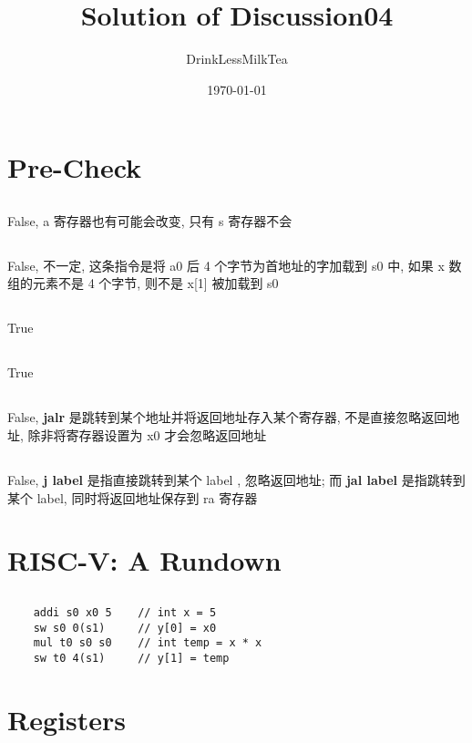 \documentclass[UTF8,10pt,a4paper]{ctexart}
\title{Solution of Discussion04}
\author{DrinkLessMilkTea}
\date{\today}
\begin{document}
\maketitle
\section{Pre-Check}
\subsection{}
False, a 寄存器也有可能会改变, 只有 s 寄存器不会
\subsection{}
False, 不一定, 这条指令是将 a0 后 4 个字节为首地址的字加载到 s0 中, 如果 x 数组的元素不是 4 个字节, 则不是 x[1] 被加载到 s0
\subsection{}
True
\subsection{}
True
\subsection{}
False, \textbf{jalr} 是跳转到某个地址并将返回地址存入某个寄存器, 不是直接忽略返回地址, 除非将寄存器设置为 x0 才会忽略返回地址
\subsection{}
False, \textbf{j label} 是指直接跳转到某个 label , 忽略返回地址; 而 \textbf{jal label} 是指跳转到某个 label, 同时将返回地址保存到 ra 寄存器 

\section{RISC-V: A Rundown}
\subsection{}
\begin{verbatim}
    addi s0 x0 5    // int x = 5
    sw s0 0(s1)     // y[0] = x0
    mul t0 s0 s0    // int temp = x * x
    sw t0 4(s1)     // y[1] = temp
\end{verbatim}
\section{Registers}
\end{document}
